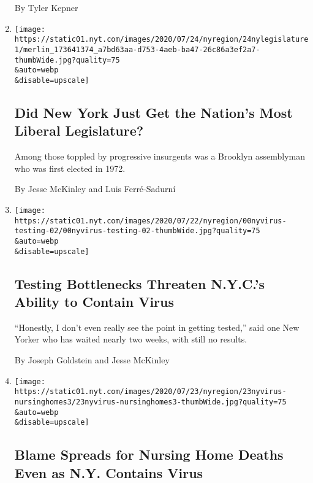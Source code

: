 \begin{enumerate}
  By Tyler Kepner
\item
  \href{/2020/07/24/nyregion/progressive-primaries-ny-legislature.html}{}

  \texttt{[image: https://static01.nyt.com/images/2020/07/24/nyregion/24nylegislature1/merlin\_173641374\_a7bd63aa-d753-4aeb-ba47-26c86a3ef2a7-thumbWide.jpg?quality=75\\\&auto=webp\\\&disable=upscale]}

  \hypertarget{did-new-york-just-get-the-nations-most-liberal-legislature}{%
  \subsection{Did New York Just Get the Nation's Most Liberal
  Legislature?}\label{did-new-york-just-get-the-nations-most-liberal-legislature}}

  Among those toppled by progressive insurgents was a Brooklyn
  assemblyman who was first elected in 1972.

  By Jesse McKinley and Luis Ferré-Sadurní
\item
  \href{/2020/07/23/nyregion/coronavirus-testing-nyc.html}{}

  \texttt{[image: https://static01.nyt.com/images/2020/07/22/nyregion/00nyvirus-testing-02/00nyvirus-testing-02-thumbWide.jpg?quality=75\\\&auto=webp\\\&disable=upscale]}

  \hypertarget{testing-bottlenecks-threaten-nycs-ability-to-contain-virus}{%
  \subsection{Testing Bottlenecks Threaten N.Y.C.'s Ability to Contain
  Virus}\label{testing-bottlenecks-threaten-nycs-ability-to-contain-virus}}

  ``Honestly, I don't even really see the point in getting tested,''
  said one New Yorker who has waited nearly two weeks, with still no
  results.

  By Joseph Goldstein and Jesse McKinley
\item
  \href{/2020/07/23/nyregion/nursing-homes-deaths-cuomo.html}{}

  \texttt{[image: https://static01.nyt.com/images/2020/07/23/nyregion/23nyvirus-nursinghomes3/23nyvirus-nursinghomes3-thumbWide.jpg?quality=75\\\&auto=webp\\\&disable=upscale]}

  \hypertarget{blame-spreads-for-nursing-home-deaths-even-as-ny-contains-virus}{%
  \subsection{Blame Spreads for Nursing Home Deaths Even as N.Y.
  Contains
  Virus}\label{blame-spreads-for-nursing-home-deaths-even-as-ny-contains-virus}}


\end{enumerate}
